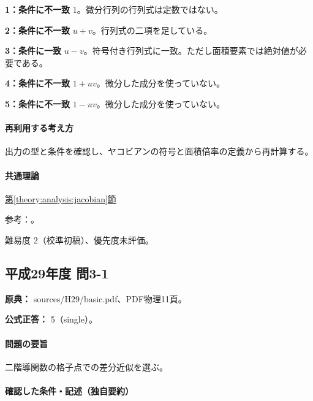 \noindent\textbf{1：条件に不一致} \(1\)。微分行列の行列式は定数ではない。\par

\noindent\textbf{2：条件に不一致} \(u+v\)。行列式の二項を足している。\par

\noindent\textbf{3：条件に一致} \(u-v\)。符号付き行列式に一致。ただし面積要素では絶対値が必要である。\par

\noindent\textbf{4：条件に不一致} \(1+uv\)。微分した成分を使っていない。\par

\noindent\textbf{5：条件に不一致} \(1-uv\)。微分した成分を使っていない。\par

\paragraph{再利用する考え方} 出力の型と条件を確認し、ヤコビアンの符号と面積倍率の定義から再計算する。

\paragraph{共通理論} \hyperref[theory:analysis:jacobian]{第\ref*{theory:analysis:jacobian}節}

\par 参考：\cite{mit_jacobian2007}。

\par 難易度 2（校準初稿）、優先度未評価。

\subsection{平成29年度 問3-1}
\label{q:h29-reg-basic-3-1}

\noindent\textbf{原典：} sources/H29/basic.pdf、PDF物理11頁。

\textbf{公式正答：} 5（single）。

\paragraph{問題の要旨} 二階導関数の格子点での差分近似を選ぶ。

\paragraph{確認した条件・記述（独自要約）}\mbox{}\par

